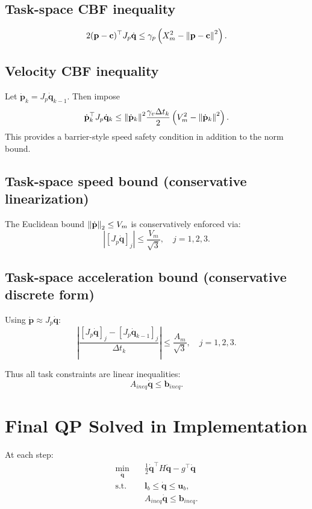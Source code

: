 \documentclass[11pt,a4paper]{article}
\begin{document}
\subsection{Task-space CBF inequality}
\[
2(\mathbf{p}-\mathbf{c})^\top J_p\dot{\mathbf{q}}
\le
\gamma_p\left(X_m^2-\norm{\mathbf{p}-\mathbf{c}}^2\right).
\]

\subsection{Velocity CBF inequality}
Let \(\dot{\mathbf{p}}_k=J_p\dot{\mathbf{q}}_{k-1}\). Then impose
\[
\dot{\mathbf{p}}_k^\top J_p\dot{\mathbf{q}}_k
\le
\norm{\dot{\mathbf{p}}_k}^2
\frac{\gamma_v\Delta t_k}{2}\left(V_m^2-\norm{\dot{\mathbf{p}}_k}^2\right).
\]
This provides a barrier-style speed safety condition in addition to the norm bound.

\subsection{Task-space speed bound (conservative linearization)}
The Euclidean bound \(\norm{\dot{\mathbf{p}}}_2\le V_m\) is conservatively enforced via:
\[
\left|[J_p\dot{\mathbf{q}}]_j\right| \le \frac{V_m}{\sqrt{3}},\quad j=1,2,3.
\]

\subsection{Task-space acceleration bound (conservative discrete form)}
Using \(\dot{\mathbf{p}}\approx J_p\dot{\mathbf{q}}\):
\[
\left|
\frac{[J_p\dot{\mathbf{q}}]_j - [J_p\dot{\mathbf{q}}_{k-1}]_j}{\Delta t_k}
\right|
\le
\frac{A_m}{\sqrt{3}},\quad j=1,2,3.
\]

Thus all task constraints are linear inequalities:
\[
A_{ineq}\dot{\mathbf{q}}\le \mathbf{b}_{ineq}.
\]

\section{Final QP Solved in Implementation}

At each step:
\[
\begin{aligned}
\min_{\dot{\mathbf{q}}}\quad&
\frac12\dot{\mathbf{q}}^\top H\dot{\mathbf{q}}-g^\top\dot{\mathbf{q}}\\
\text{s.t.}\quad&
\mathbf{l}_b\le \dot{\mathbf{q}}\le \mathbf{u}_b,\\
&A_{ineq}\dot{\mathbf{q}}\le \mathbf{b}_{ineq}.
\end{aligned}
\]
\end{document}
